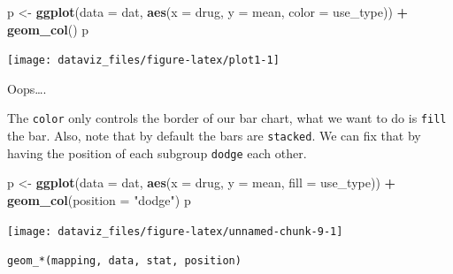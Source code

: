 \documentclass[]{book}
\newenvironment{Shaded}{\begin{snugshade}}{\end{snugshade}}
\newcommand{\DataTypeTok}[1]{\textcolor[rgb]{0.13,0.29,0.53}{#1}}
\newcommand{\KeywordTok}[1]{\textcolor[rgb]{0.13,0.29,0.53}{\textbf{#1}}}
\newcommand{\NormalTok}[1]{#1}
\newcommand{\OperatorTok}[1]{\textcolor[rgb]{0.81,0.36,0.00}{\textbf{#1}}}
\newcommand{\StringTok}[1]{\textcolor[rgb]{0.31,0.60,0.02}{#1}}
\theoremstyle{definition}
\theoremstyle{definition}
\theoremstyle{definition}
\theoremstyle{remark}
\begin{document}
\begin{Shaded}
\begin{Highlighting}[]
\NormalTok{p <-}\StringTok{ }\KeywordTok{ggplot}\NormalTok{(}\DataTypeTok{data =}\NormalTok{ dat, }\KeywordTok{aes}\NormalTok{(}\DataTypeTok{x =}\NormalTok{ drug, }\DataTypeTok{y =}\NormalTok{ mean, }\DataTypeTok{color =}\NormalTok{ use_type)) }\OperatorTok{+}
\StringTok{  }\KeywordTok{geom_col}\NormalTok{()}
\NormalTok{p}
\end{Highlighting}
\end{Shaded}

\begin{center}\texttt{[image: dataviz\_files/figure-latex/plot1-1]} \end{center}

Oops\ldots{}.

The \texttt{color} only controls the border of our bar chart, what we
want to do is \texttt{fill} the bar. Also, note that by default the bars
are \texttt{stacked}. We can fix that by having the position of each
subgroup \texttt{dodge} each other.

\begin{Shaded}
\begin{Highlighting}[]
\NormalTok{p <-}\StringTok{ }\KeywordTok{ggplot}\NormalTok{(}\DataTypeTok{data =}\NormalTok{ dat, }\KeywordTok{aes}\NormalTok{(}\DataTypeTok{x =}\NormalTok{ drug, }\DataTypeTok{y =}\NormalTok{ mean, }\DataTypeTok{fill =}\NormalTok{ use_type)) }\OperatorTok{+}
\StringTok{  }\KeywordTok{geom_col}\NormalTok{(}\DataTypeTok{position =} \StringTok{"dodge"}\NormalTok{)}
\NormalTok{p}
\end{Highlighting}
\end{Shaded}

\begin{center}\texttt{[image: dataviz\_files/figure-latex/unnamed-chunk-9-1]} \end{center}

\texttt{geom\_*(mapping,\ data,\ stat,\ position)}
\end{document}
